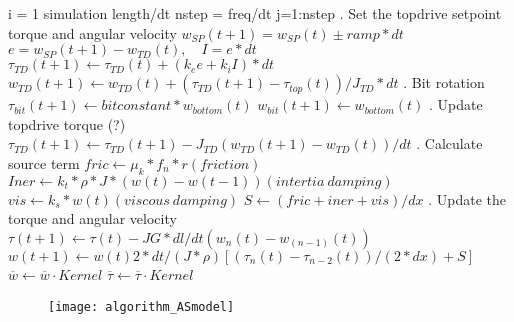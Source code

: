 \begin{code}[\codenumbering]{}
\codeitemnonumber \pseudocodefor{} i = 1 simulation length/dt
	\stepcodelevel{}
	\codeitemnonumber nstep = freq/dt
	\codeitemnonumber \pseudocodefor{} {j=1:nstep}
		\stepcodelevel{}
	    . Set the topdrive setpoint torque and angular velocity
	    \codeitemnonumber $w_{SP}(t+1)=w_{SP}(t)\pm ramp*dt$
	    \codeitemnonumber $e=w_{SP}(t+1)-w_{TD}(t), \quad I=e*dt$
	    \codeitemnonumber $\tau_{TD}(t+1) \gets \tau_{TD}(t) + (k_e e + k_i I)*dt$
	    \codeitemnonumber $w_{TD}(t+1) \gets w_{TD}(t) + (\tau_{TD}(t+1)-\tau_{top}(t))/J_{TD}*dt$
	    . Bit rotation
	    \codeitemnonumber $\tau_{bit}(t+1) \gets bitconstant * w_{bottom}(t)$
	    \codeitemnonumber $w_{bit}(t+1) \gets w_{bottom}(t)$
	    . Update topdrive torque (?)
	    \codeitemnonumber $\tau_{TD}(t+1) \gets \tau_{TD}(t+1)-J_{TD}(w_{TD}(t+1)-w_{TD}(t))/dt$
	    . Calculate source term
	    \codeitemnonumber $fric \gets \mu_k*f_n*r (friction)$
	    \codeitemnonumber $Iner \gets k_t*\rho*J*(w(t)-w(t-1)) (intertia\:damping)$
	    \codeitemnonumber $vis \gets k_s*w(t) (viscous\:damping)$
	    \codeitemnonumber $S \gets (fric+iner+vis)/dx$
	    . Update the torque and angular velocity 
	    \codeitemnonumber $\tau(t+1) \gets \tau(t) - JG*dl/dt (w_n(t)-w_(n-1)(t))$ 
	    \codeitemnonumber $w(t+1) \gets w(t) 2*dt/(J*\rho)\left[(\tau_n(t)-\tau_{n-2}(t))/(2*dx)+S\right]$
	    \prevcodelevel{}
	\codeitemnonumber \pseudocodedonefor{}
	\codeitemnonumber $\overline{w} \gets \overline{w} \cdot Kernel$ 
	\codeitemnonumber $\overline{\tau} \gets \overline{\tau} \cdot Kernel$
	\prevcodelevel{}
\codeitemnonumber \pseudocodedonefor{}
\end{code}
\popinitialcodeindent{}
\begin{figure}[!hbt]
  \centering
  \texttt{[image: algorithm\_ASmodel]}
\end{figure}


